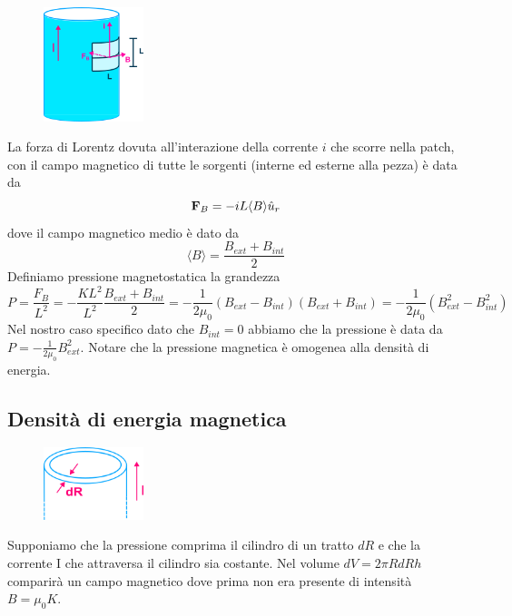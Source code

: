 \begin{figure}  %
    \centering
    \includegraphics[width=0.26\textwidth]{images/pressionemagneto1}  %
\end{figure}
La forza di Lorentz dovuta all'interazione della corrente $i$ che scorre nella patch, con il campo magnetico di tutte le sorgenti (interne ed esterne alla pezza) \`e data da 
\begin{equation*}
	\bold{F}_{B} = -iL \langle B \rangle \hat{u}_{r}
\end{equation*} 
dove il campo magnetico medio \`e dato da 
\begin{equation*}
	\langle B \rangle = \frac{B_{ext} + B_{int}}{2}
\end{equation*}
Definiamo pressione magnetostatica la grandezza 
\begin{equation*}
	P = \frac{F_{B}}{L^2} = - \frac{KL^2}{L^2} \frac{B_{ext}+B_{int}}{2} = - \frac{1}{2 \mu_0} (B_{ext}-B_{int})(B_{ext} + B_{int} ) = -\frac{1}{2 \mu_0}(B_{ext}^2 - B_{int}^2) 
\end{equation*}
Nel nostro caso specifico dato che $B_{int} = 0$ abbiamo che la pressione \`e data da $P = - \frac{1}{2 \mu_0}B_{ext}^2$.
Notare che la pressione magnetica \`e omogenea alla densit\`a di energia.

\subsection{Densit\`a di energia magnetica}
\begin{figure}  %
    \centering
    \includegraphics[width=0.26\textwidth]{images/magnenrgy}  %
\end{figure}
Supponiamo che la pressione comprima il cilindro di un tratto $dR$ e che la corrente I che attraversa il cilindro sia costante. Nel volume $dV = 2\pi RdRh$ comparir\`a un campo magnetico dove prima non era presente di intensit\`a $B = \mu_0 K$.

